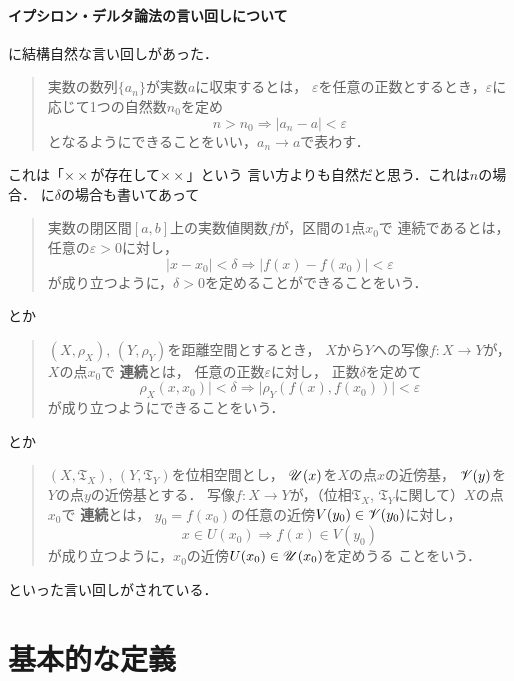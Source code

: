 \paragraph{イプシロン・デルタ論法の言い回しについて}
\cite[p.26]{Mori81}に結構自然な言い回しがあった．
\begin{quotation}
    実数の数列\(\{a_n\}\)が実数\(a\)に収束するとは，
    \(\varepsilon\)を任意の正数とするとき，\(\varepsilon\)に
    応じて1つの自然数\(n_0\)を定め
    \[
        n>n_0\Longrightarrow\lvert a_n- a\rvert <\varepsilon
    \]
    となるようにできることをいい，\(a_n\to a\)で表わす．
\end{quotation}
これは「\(\times\times\)が存在して\(\times\times\)」という
言い方よりも自然だと思う．これは\(n\)の場合．
\cite[pp.67--68]{Mori81}に\(\delta\)の場合も書いてあって
\begin{quotation}
    実数の閉区間\([a,b]\)上の実数値関数\(f\)が，区間の1点\(x_0\)で
    連続であるとは，
    任意の\(\varepsilon>0\)に対し，
    \[
        \lvert x- x_0\rvert<\delta
        \Longrightarrow
        \lvert f(x)- f(x_0)\rvert <\varepsilon
    \]
    が成り立つように，\(\delta>0\)を定めることができることをいう．
\end{quotation}
とか
\begin{quotation}
    \((X,\rho_X)\), 
    \((Y,\rho_Y)\)を距離空間とするとき，
    \(X\)から\(Y\)への写像\(f\colon X\to Y\)が，\(X\)の点\(x_0\)で
    \textbf{連続}とは，
    任意の正数\(\varepsilon\)に対し，
    正数\(\delta\)を定めて
    \[
        \rho_X(x, x_0)\rvert<\delta
        \Longrightarrow
        \lvert \rho_Y(f(x),f(x_0))\rvert <\varepsilon
    \]
    が成り立つようにできることをいう．
\end{quotation}
とか
\begin{quotation}
    \((X,\mathfrak{T}_X)\), 
    \((Y,\mathfrak{T}_Y)\)を位相空間とし，
    \(\mathscr{U}(x)\)を\(X\)の点\(x\)の近傍基，
    \(\mathscr{V}(y)\)を\(Y\)の点\(y\)の近傍基とする．
    写像\(f\colon X\to Y\)が，（位相\(\mathfrak{T}_X\), 
    \(\mathfrak{T}_Y\)に関して）\(X\)の点\(x_0\)で
    \textbf{連続}とは，
    \(y_0=f(x_0)\)の任意の近傍\(V(y_0)\in\mathscr{V}(y_0)\)に対し，
    \[
        x\in U(x_0)
        \Longrightarrow
        f(x)\in V(y_0)
    \]
    が成り立つように，\(x_0\)の近傍\(U(x_0)\in \mathscr{U}(x_0)\)を定めうる
    ことをいう．
\end{quotation}
といった言い回しがされている．
\section{基本的な定義}

